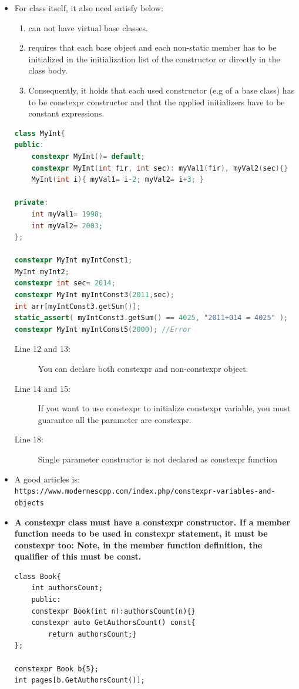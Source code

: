 \documentclass[a4paper,11pt,twoside]{book}
\begin{document}
\begin{itemize}
	\item For class itself, it also need satisfy below:
	\begin{enumerate}
		\item can not have virtual base classes.
		\item requires that each base object and each non-static member has to be initialized in the initialization list of the constructor or directly in the class body. 
		\item Consequently, it holds that each used constructor (e.g of a base class) has to be constexpr constructor and that the applied initializers have to be constant expressions.
	\end{enumerate}

\begin{lstlisting}[frame=single, language=c++]
class MyInt{
public:
	constexpr MyInt()= default;
	constexpr MyInt(int fir, int sec): myVal1(fir), myVal2(sec){}
	MyInt(int i){ myVal1= i-2; myVal2= i+3; }
	
private:
	int myVal1= 1998;
	int myVal2= 2003;
};
	
constexpr MyInt myIntConst1;
MyInt myInt2;
constexpr int sec= 2014;
constexpr MyInt myIntConst3(2011,sec);
int arr[myIntConst3.getSum()];
static_assert( myIntConst3.getSum() == 4025, "2011+014 = 4025" );
constexpr MyInt myIntConst5(2000); //Error
\end{lstlisting}
\begin{description}
	\item[Line 12 and 13:] You can declare both constexpr and non-constexpr object.
	
	\item[Line 14 and 15:] If you want to use constexpr to initialize constexpr variable, you must guarantee all the parameter are constexpr.
	
	\item[Line 18:] Single parameter constructor is not declared as constexpr function
\end{description}
	\item A good articles is: \\ \verb|https://www.modernescpp.com/index.php/constexpr-variables-and-objects|

	\item \textbf{A constexpr class must have a constexpr constructor. If a member function needs to be used in constexpr statement, it must be constexpr too: Note, in the member function definition, the qualifier of this must be const.}
\begin{lstlisting}
class Book{
    int authorsCount;
    public:
    constexpr Book(int n):authorsCount(n){}
    constexpr auto GetAuthorsCount() const{ 
        return authorsCount;}
};

constexpr Book b{5};
int pages[b.GetAuthorsCount()];
\end{lstlisting}
	
\end{itemize}
\end{document}
